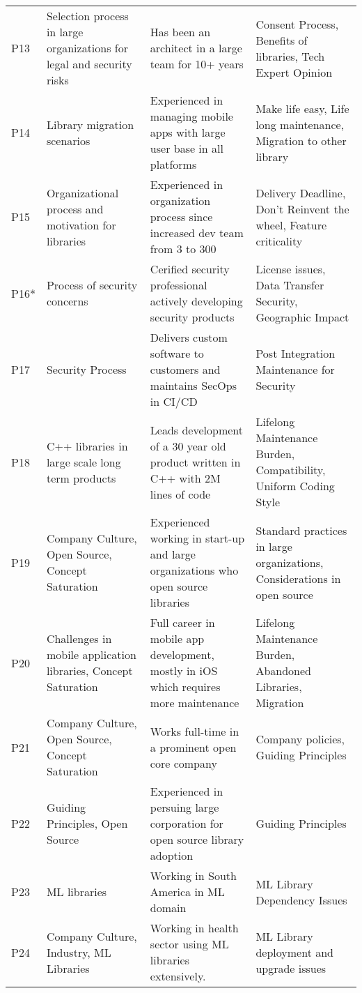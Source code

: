 \begin{table*}[]
\begin{tabular}{p{.4cm}p{4cm}p{6cm}p{6cm}}
P13 & Selection process in large organizations for legal and security risks & Has been an architect in a large team for 10+ years & Consent Process, Benefits of libraries, Tech Expert Opinion \\ 
P14 & Library migration scenarios & Experienced in managing mobile apps with large user base in all platforms & Make life easy, Life long maintenance, Migration to other library \\ 
P15 & Organizational process and motivation for libraries & Experienced in organization process since increased dev team from 3 to 300 & Delivery Deadline, Don't Reinvent the wheel, Feature criticality \\ 
P16* & Process of security concerns & Cerified security professional actively developing security products & License issues, Data Transfer Security, Geographic Impact  \\ 
P17 & Security Process & Delivers custom software to customers and maintains SecOps in CI/CD & Post Integration Maintenance for Security \\ 
P18 & C++ libraries in large scale long term products & Leads development of a 30 year old product written in C++ with 2M lines of code & Lifelong Maintenance Burden, Compatibility, Uniform Coding Style \\ 
P19 & Company Culture, Open Source, Concept Saturation & Experienced working in start-up and large organizations who open source libraries & Standard practices in large organizations, Considerations in open source \\ 
P20 & Challenges in mobile application libraries, Concept Saturation & Full career in mobile app development, mostly in iOS which requires more maintenance & Lifelong Maintenance Burden, Abandoned Libraries, Migration \\ 
P21 & Company Culture, Open Source, Concept Saturation & Works full-time in a prominent open core company & Company policies, Guiding Principles \\ 
P22 & Guiding Principles, Open Source & Experienced in persuing large corporation for open source library adoption & Guiding Principles \\ 
P23 & ML libraries & Working in South America in ML domain & ML Library Dependency Issues \\ 
P24 & Company Culture, Industry, ML Libraries & Working in health sector using ML libraries extensively. & ML Library deployment and upgrade issues \\ 

\bottomrule
    \end{tabular}
    \label{tab:theoritcal-sampling}
\end{table*}